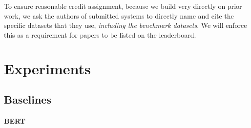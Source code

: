 To ensure reasonable credit assignment, because we build very directly on prior work, we ask the authors of submitted systems to directly name and cite the specific datasets that they use, \textit{including the benchmark datasets}. We will enforce this as a requirement for papers to be listed on the leaderboard.

\section{Experiments}

\subsection{Baselines}

\paragraph{BERT}

